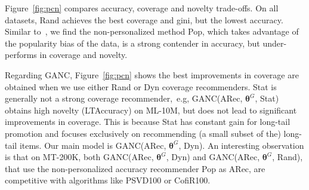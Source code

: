 Figure~\ref{fig:pcn} compares  accuracy, coverage and novelty trade-offs. On all datasets,  Rand achieves the best coverage and gini, but  the lowest  accuracy.  Similar to~\cite{cremonesi2010performance,vargas2014improving}, we find the non-personalized method Pop,  which takes advantage of the  popularity bias of the data, is a strong contender in accuracy, but under-performs in coverage and novelty. 

Regarding GANC,  Figure~\ref{fig:pcn} shows the best improvements in coverage are obtained when we use either Rand or Dyn coverage recommenders. Stat is generally not a strong coverage recommender,~e.g, GANC(ARec, $\bm{\theta}^G$, Stat) obtains high novelty (LTAccuracy)  on ML-10M, but does not lead to significant improvements in coverage.  This is because Stat has constant gain for long-tail promotion and focuses exclusively on recommending (a small subset of the) long-tail items.  Our main model is GANC(ARec, $\bm{\theta}^G$, Dyn). An interesting observation is that on MT-200K, both GANC(ARec, $\bm{\theta}^G$, Dyn) and GANC(ARec, $\bm{\theta}^G$, Rand), that use the non-personalized accuracy recommender Pop as ARec, are competitive with algorithms like  PSVD100 or CofiR100.




